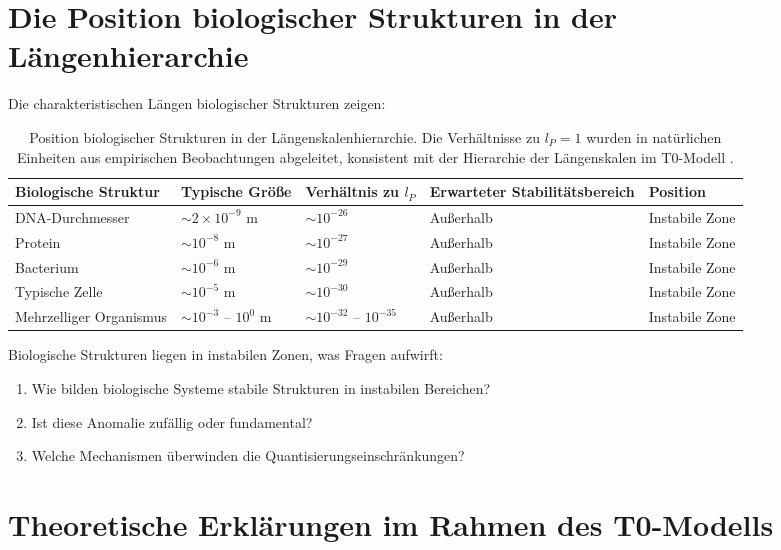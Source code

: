 \documentclass[12pt,a4paper]{article}
\begin{document}
	\section{Die Position biologischer Strukturen in der Längenhierarchie}
	
	Die charakteristischen Längen biologischer Strukturen zeigen:
	
	\begin{table}[h]
		\centering
		\begin{adjustbox}{scale=0.8}
			\begin{tabular}{lllll}
				\hline
				\textbf{Biologische Struktur} & \textbf{Typische Größe} & \textbf{Verhältnis zu $l_P$} & \textbf{Erwarteter Stabilitätsbereich} & \textbf{Position} \\
				\hline
				DNA-Durchmesser & $\sim 2 \times 10^{-9}$ m & $\sim 10^{-26}$ & Außerhalb & Instabile Zone \\
				Protein & $\sim 10^{-8}$ m & $\sim 10^{-27}$ & Außerhalb & Instabile Zone \\
				Bacterium & $\sim 10^{-6}$ m & $\sim 10^{-29}$ & Außerhalb & Instabile Zone \\
				Typische Zelle & $\sim 10^{-5}$ m & $\sim 10^{-30}$ & Außerhalb & Instabile Zone \\
				Mehrzelliger Organismus & $\sim 10^{-3}$ – $10^{0}$ m & $\sim 10^{-32}$ – $10^{-35}$ & Außerhalb & Instabile Zone \\
				\hline
			\end{tabular}
		\end{adjustbox}
		\caption{Position biologischer Strukturen in der Längenskalenhierarchie. Die Verhältnisse zu $l_P = 1$ wurden in natürlichen Einheiten aus empirischen Beobachtungen abgeleitet, konsistent mit der Hierarchie der Längenskalen im T0-Modell \cite{pascher_nateinheiten_2025}.}
		\label{tab:bio_structures}
	\end{table}
	
	Biologische Strukturen liegen in instabilen Zonen, was Fragen aufwirft:
	\begin{enumerate}
		\item Wie bilden biologische Systeme stabile Strukturen in instabilen Bereichen?
		\item Ist diese Anomalie zufällig oder fundamental?
		\item Welche Mechanismen überwinden die Quantisierungseinschränkungen?
	\end{enumerate}
	
	\section{Theoretische Erklärungen im Rahmen des T0-Modells}
	
\end{document}
